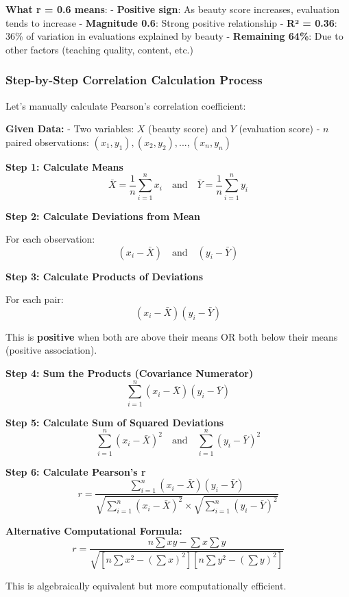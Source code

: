 \documentclass[11pt]{article}
\begin{document}
\textbf{What r = 0.6 means}: - \textbf{Positive sign}: As beauty score
increases, evaluation tends to increase - \textbf{Magnitude 0.6}: Strong
positive relationship - \textbf{R² = 0.36}: 36\% of variation in
evaluations explained by beauty - \textbf{Remaining 64\%}: Due to other
factors (teaching quality, content, etc.)

    \subsubsection{\texorpdfstring{\textbf{Step-by-Step Correlation
Calculation
Process}}{Step-by-Step Correlation Calculation Process}}\label{step-by-step-correlation-calculation-process}

Let's manually calculate Pearson's correlation coefficient:

\textbf{Given Data:} - Two variables: \(X\) (beauty score) and \(Y\)
(evaluation score) - \(n\) paired observations:
\((x_1, y_1), (x_2, y_2), ..., (x_n, y_n)\)

\textbf{Step 1: Calculate Means}
\[\bar{X} = \frac{1}{n}\sum_{i=1}^{n} x_i \quad \text{and} \quad \bar{Y} = \frac{1}{n}\sum_{i=1}^{n} y_i\]

\textbf{Step 2: Calculate Deviations from Mean}

For each observation:
\[(x_i - \bar{X}) \quad \text{and} \quad (y_i - \bar{Y})\]

\textbf{Step 3: Calculate Products of Deviations}

For each pair: \[(x_i - \bar{X})(y_i - \bar{Y})\]

This is \textbf{positive} when both are above their means OR both below
their means (positive association).

\textbf{Step 4: Sum the Products (Covariance Numerator)}
\[\sum_{i=1}^{n}(x_i - \bar{X})(y_i - \bar{Y})\]

\textbf{Step 5: Calculate Sum of Squared Deviations}
\[\sum_{i=1}^{n}(x_i - \bar{X})^2 \quad \text{and} \quad \sum_{i=1}^{n}(y_i - \bar{Y})^2\]

\textbf{Step 6: Calculate Pearson's r}
\[r = \frac{\sum_{i=1}^{n}(x_i - \bar{X})(y_i - \bar{Y})}{\sqrt{\sum_{i=1}^{n}(x_i - \bar{X})^2} \times \sqrt{\sum_{i=1}^{n}(y_i - \bar{Y})^2}}\]

\textbf{Alternative Computational Formula:}
\[r = \frac{n\sum xy - \sum x \sum y}{\sqrt{[n\sum x^2 - (\sum x)^2][n\sum y^2 - (\sum y)^2]}}\]

This is algebraically equivalent but more computationally efficient.
\end{document}
